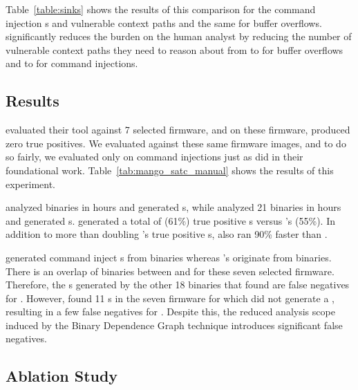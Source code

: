 Table~\ref{table:sinks} shows the results of this comparison for the command injection \mango \trupoc{}s and vulnerable context paths and the same for buffer overflows.
\mango significantly reduces the burden on the human analyst by reducing the number of vulnerable context paths they need to reason about from \contextOverflow to \alertedOverflow for buffer overflows and \contextCmdi to \alertedCmdi for command injections.


\subsection{\satcHandPickDataset Results}
\label{sec:focused_eval}


\satc evaluated their tool against 7 selected firmware, and on these firmware, \karonte produced zero true positives.
We evaluated \mango against these same firmware images, and to do so fairly, we evaluated only on command injections just as \satc did in their foundational work.
Table~\ref{tab:mango_satc_manual} shows the results of this experiment.

\mango analyzed \satcManTotalBinAmount binaries in \mangoManTotalTimeHours hours and generated \mangoManTotalAlerts \trupoc{}s, while \satc analyzed 21 binaries in \satcManTotalTimeHours hours and generated \satcManTotalAlerts \trupoc{}s.
\mango generated a total of \mangoManTotalTP (61\%) true positive \trupoc{}s versus \satc's \satcManTotalTP (55\%).
In addition to more than doubling \satc's true positive \trupoc{}s, \mango also ran 90\% faster than \satc.

\mango generated \mangoManTotalAlerts command inject \trupoc{}s from \mangoManTotalBins binaries whereas \satc's \satcManTotalAlerts originate from \satcManTotalBins binaries.
There is an overlap of \satcManTotalBins binaries between \mango and \satc for these seven selected firmware.
Therefore, the \trupoc{}s generated by the other 18 binaries that \mango found are false negatives for \satc.
However, \satc found 11 \trupoc{}s in the seven firmware for which \mango did not generate a \trupoc, resulting in a few false negatives for \mango.
Despite this, the reduced analysis scope induced by the Binary Dependence Graph technique introduces significant false negatives.




\subsection{Ablation Study}
\label{sec:ablation}

